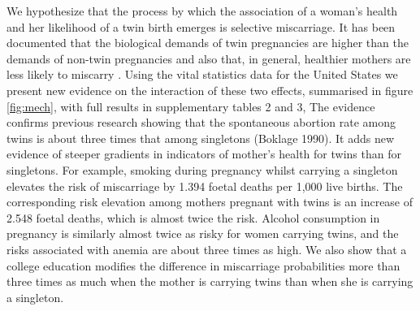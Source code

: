 \documentclass{nature}
\begin{document}
\begin{linenumbers}
We hypothesize that the process by which the association of a woman's health and her likelihood of a twin birth emerges is selective miscarriage. It has been documented that the biological demands of twin pregnancies are higher than the demands of non-twin pregnancies\cite{Shinagawaetal2005,Kahnetal2003} and also that, in general, healthier mothers are less likely to miscarry \cite{Frettsetal1995,Garciaetal2002}. Using the vital statistics data for the United States we present new evidence on the interaction of these two effects, summarised in figure \ref{fig:mech}, with full results in supplementary tables 2 and 3, %
The evidence confirms previous research showing that the spontaneous abortion rate among twins is about three times that among singletons (Boklage 1990). It adds new evidence of steeper gradients in indicators of mother's health for twins than for singletons. For example, smoking during pregnancy whilst carrying a singleton elevates the risk of miscarriage by 1.394 foetal deaths per 1,000 live births. 
The corresponding risk elevation among mothers pregnant with twins is an increase of 2.548 foetal deaths, which is almost twice the risk. 
Alcohol consumption in pregnancy is similarly almost twice as risky for women carrying twins, and the risks associated with anemia are about three times as high. We also show that a college education modifies the difference in miscarriage probabilities more than three times as much when the mother is carrying twins than when she is carrying a singleton. 


\end{linenumbers}
\end{document}
